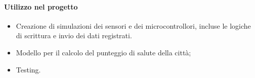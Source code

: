 \paragraph{Utilizzo nel progetto} 
\begin{itemize}
    \item Creazione di simulazioni dei sensori e dei microcontrollori, incluse le logiche di scrittura e invio dei dati registrati.
    \item Modello per il calcolo del punteggio di salute della città;
    \item Testing.
    \end{itemize}